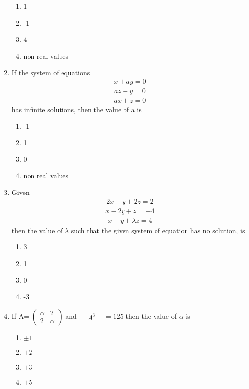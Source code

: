 \begin{enumerate}[label=\arabic*.,ref=\thesubsection.\theenumi]
 \begin{enumerate}
 \item 1
 \item -1
 \item 4
 \item non real values
 \end{enumerate}
 \item If the system of equations 
 \begin{align} x+ay=0
 \end{align}  
 \begin{align} az+y=0
 \end{align} 
 \begin{align} ax+z=0
 \end{align} has infinite solutions, then the value of a is 
 \begin{enumerate}
 \item -1
 \item 1
 \item 0
 \item non real values
 \end{enumerate}
 \item Given 
 \begin{align} 2x-y+2z=2
 \end{align}  
 \begin{align} x-2y+z=-4
 \end{align}  
 \begin{align} x+y+\lambda z=4
 \end{align} then the value of $\lambda$ such that the given system of equation has no solution, is
 \begin{enumerate}
 \item 3
 \item 1
 \item 0
 \item -3
\end{enumerate}
\item If A= $\begin{pmatrix} \alpha & 2 \\ 2 & \alpha \end{pmatrix}$ and  $\begin{vmatrix} A^3\end{vmatrix}=125$ then the value of $\alpha$ is 
\begin{enumerate}
 \item $\pm1$
 \item $\pm2$
 \item $\pm3$
 \item $\pm5$

\end{enumerate}
\end{enumerate}
